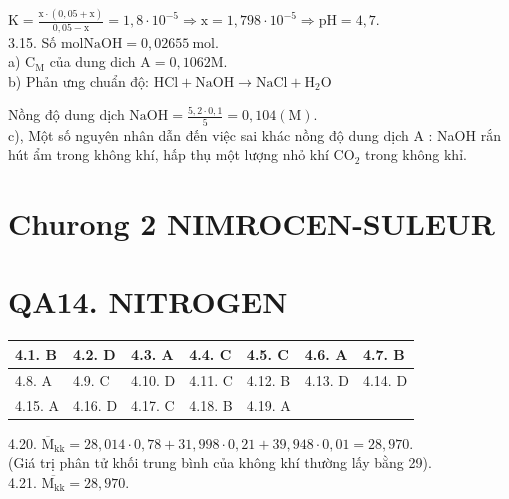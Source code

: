 \documentclass[10pt]{article}
\begin{document}
$\mathrm{K}=\frac{\mathrm{x} \cdot(0,05+\mathrm{x})}{0,05-\mathrm{x}}=1,8 \cdot 10^{-5} \Rightarrow \mathrm{x}=1,798 \cdot 10^{-5} \Rightarrow \mathrm{pH}=4,7$.\\
3.15. Số $\mathrm{mol} \mathrm{NaOH}=0,02655 \mathrm{~mol}$.\\
a) $\mathrm{C}_{\mathrm{M}}$ của dung dich $\mathrm{A}=0,1062 \mathrm{M}$.\\
b) Phản ưng chuẩn độ: $\mathrm{HCl}+\mathrm{NaOH} \longrightarrow \mathrm{NaCl}+\mathrm{H}_{2} \mathrm{O}$

Nồng độ dung dịch $\mathrm{NaOH}=\frac{5,2 \cdot 0,1}{5}=0,104(\mathrm{M})$.\\
c), Một số nguyên nhân dẫn đến việc sai khác nồng độ dung dịch A : NaOH rắn hút ẩm trong không khí, hấp thụ một lượng nhỏ khí $\mathrm{CO}_{2}$ trong không khỉ.

\section*{Churong 2 NIMROCEN-SULEUR}
\section*{QA14. NITROGEN}
\begin{center}
\begin{tabular}{|l|l|l|l|l|l|l|}
\hline
4.1. B & 4.2. D & 4.3. A & 4.4. C & 4.5. C & 4.6. A & 4.7. B \\
\hline
4.8. A & 4.9. C & 4.10. D & 4.11. C & 4.12. B & 4.13. D & 4.14. D \\
\hline
4.15. A & 4.16. D & 4.17. C & 4.18. B & 4.19. A &  &  \\
\hline
\end{tabular}
\end{center}

4.20. $\overline{\mathrm{M}}_{\mathrm{kk}}=28,014 \cdot 0,78+31,998 \cdot 0,21+39,948 \cdot 0,01=28,970$.\\
(Giá trị phân tử khối trung bình của không khí thường lấy bằng 29).\\
4.21. $\overline{\mathrm{M}_{\mathrm{kk}}}=28,970$.
\end{document}
